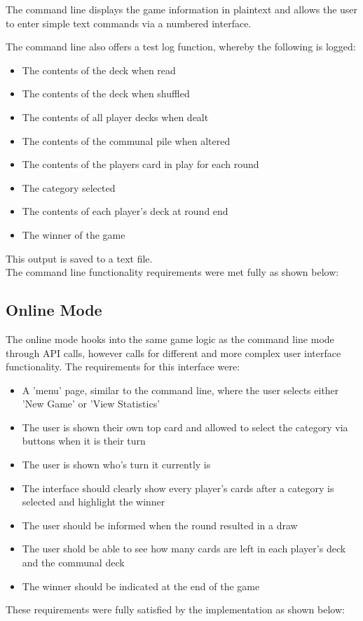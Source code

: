 The command line displays the game information in plaintext and allows the user to enter simple text commands via a numbered interface. \\

\newpage

The command line also offers a test log function, whereby the following is logged:
\begin{itemize}
\item The contents of the deck when read
\item The contents of the deck when shuffled
\item The contents of all player decks when dealt
\item The contents of the communal pile when altered
\item The contents of the players card in play for each round
\item The category selected
\item The contents of each player's deck at round end
\item The winner of the game
\end{itemize}

This output is saved to a text file. \\

The command line functionality requirements were met fully as shown below:

\subsection{Online Mode}
The online mode hooks into the same game logic as the command line mode through API calls, however calls for different and more complex user interface functionality. The requirements for this interface were:
\begin{itemize}
\item A 'menu' page, similar to the command line, where the user selects either 'New Game' or 'View Statistics'
\item The user is shown their own top card and allowed to select the category via buttons when it is their turn
\item The user is shown who's turn it currently is
\item The interface should clearly show every player's cards after a category is selected and highlight the winner
\item The user should be informed when the round resulted in a draw
\item The user shold be able to see how many cards are left in each player's deck and the communal deck
\item The winner should be indicated at the end of the game
\end{itemize}

These requirements were fully satisfied by the implementation as shown below:

